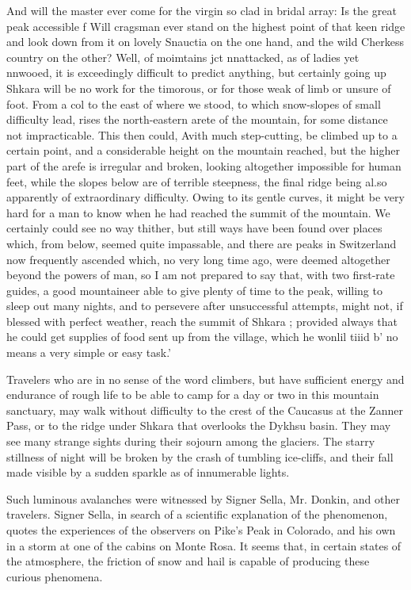 \documentclass{article}
\begin{document}
And will the master ever come for the virgin so clad in bridal array: Is the great peak accessible f Will cragsman ever stand on the highest point of that keen ridge and look down from it on lovely Snauctia on the one hand, and the wild Cherkess country on the other? Well, of moimtains jct nnattacked, as of ladies yet nnwooed, it is exceedingly difficult to predict anything, but certainly going up Shkara will be no work for the timorous, or for those weak of limb or unsure of foot. From a col to the east of where we stood, to which snow-slopes of small difficulty lead, rises the north-eastern arete of the mountain, for some distance not impracticable. This then could, Avith much step-cutting, be climbed up to a certain point, and a considerable height on the mountain reached, but the higher part of the arefe is irregular and broken, looking altogether impossible for human feet, while the slopes below are of terrible steepness, the final ridge being al.so apparently of extraordinary difficulty. Owing to its gentle curves, it might be very hard for a man to know when he had reached the summit of the mountain. We certainly could see no way thither, but still ways have been found over places which, from below, seemed quite impassable, and there are peaks in Switzerland now frequently ascended which, no very long time ago, were deemed altogether beyond the powers of man, so I am not prepared to say that, with two first-rate guides, a good mountaineer able to give plenty of time to the peak, willing to sleep out many nights, and to persevere after unsuccessful attempts, might not, if blessed with perfect weather, reach the summit of Shkara ; provided always that he could get supplies of food sent up from the village, which he wonlil tiiid b' no means a very simple or easy task.'

Travelers who are in no sense of the word climbers, but have sufficient energy and endurance of rough life to be able to camp for a day or two in this mountain sanctuary, may walk without difficulty to the crest of the Caucasus at the Zanner Pass, or to the ridge under Shkara that overlooks the Dykhsu basin. They may see many strange sights during their sojourn among the glaciers. The starry stillness of night will be broken by the crash of tumbling ice-cliffs, and their fall made visible by a sudden sparkle as of innumerable lights.

Such luminous avalanches were witnessed by Signer Sella, Mr. Donkin, and other travelers. Signer Sella, in search of a scientific explanation of the phenomenon, quotes the experiences of the observers on Pike's Peak in Colorado, and his own in a storm at one of the cabins on Monte Rosa. It seems that, in certain states of the atmosphere, the friction of snow and hail is capable of producing these curious phenomena.
\end{document}
